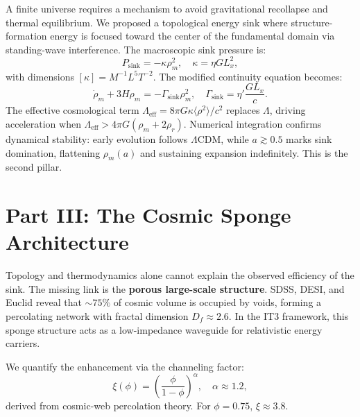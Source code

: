 \documentclass[12pt,a4paper]{article}
\begin{document}
A finite universe requires a mechanism to avoid gravitational recollapse and thermal equilibrium. We proposed a topological energy sink where structure-formation energy is focused toward the center of the fundamental domain via standing-wave interference. The macroscopic sink pressure is:
\begin{equation}
P_{\text{sink}} = -\kappa \rho_m^2, \quad \kappa = \eta G L_x^2,
\end{equation}
with dimensions $[\kappa] = M^{-1}L^5T^{-2}$. The modified continuity equation becomes:
\begin{equation}
\dot{\rho}_m + 3H\rho_m = -\Gamma_{\text{sink}}\rho_m^2, \quad \Gamma_{\text{sink}} = \eta' \frac{G L_x}{c}.
\end{equation}
The effective cosmological term $\Lambda_{\text{eff}} = 8\pi G \kappa \langle \rho^2 \rangle / c^2$ replaces $\Lambda$, driving acceleration when $\Lambda_{\text{eff}} > 4\pi G(\rho_m + 2\rho_r)$. Numerical integration confirms dynamical stability: early evolution follows $\Lambda$CDM, while $a \gtrsim 0.5$ marks sink domination, flattening $\rho_m(a)$ and sustaining expansion indefinitely. This is the second pillar.

\section{Part III: The Cosmic Sponge Architecture}

Topology and thermodynamics alone cannot explain the observed efficiency of the sink. The missing link is the \textbf{porous large-scale structure}. SDSS, DESI, and Euclid reveal that $\sim 75\%$ of cosmic volume is occupied by voids, forming a percolating network with fractal dimension $D_f \approx 2.6$. In the IT3 framework, this sponge structure acts as a low-impedance waveguide for relativistic energy carriers.

We quantify the enhancement via the channeling factor:
\begin{equation}
\xi(\phi) = \left( \frac{\phi}{1-\phi} \right)^\alpha, \quad \alpha \approx 1.2,
\end{equation}
derived from cosmic-web percolation theory. For $\phi = 0.75$, $\xi \approx 3.8$. 
\end{document}
